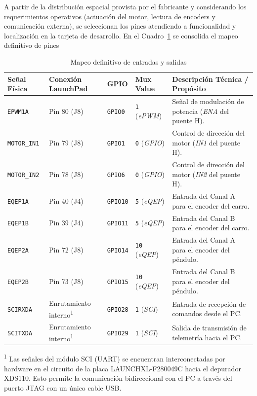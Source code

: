 \documentclass[11pt,fleqn]{book} %
\begin{document}
A partir de la distribución espacial provista por el fabricante y considerando los requerimientos operativos (actuación del motor, lectura de encoders y comunicación externa), se seleccionan los pines atendiendo a funcionalidad y localización en la tarjeta de desarrollo. En el Cuadro~\ref{tab:pinout_sistema} se consolida el mapeo definitivo de pines
\begin{table}[ht]
	\centering
	\caption{Mapeo definitivo de entradas y salidas}
	\label{tab:pinout_sistema}
	\small
	\renewcommand{\arraystretch}{1.1}
	\begin{tabularx}{\textwidth}{l l l l X}
		\hline
		\textbf{Señal Física} & \textbf{Conexión LaunchPad} & \textbf{GPIO} & \textbf{Mux Value} & \textbf{Descripción Técnica / Propósito} \\ \hline
		\texttt{EPWM1A} & Pin 80 (J8) & \texttt{GPIO0} & \texttt{1} (\textit{ePWM}) & Señal de modulación de potencia (\textit{ENA} del puente H). \\
		\texttt{MOTOR\_IN1} & Pin 79 (J8) & \texttt{GPIO1} & \texttt{0} (\textit{GPIO}) & Control de dirección del motor (\textit{IN1} del puente H). \\
		\texttt{MOTOR\_IN2} & Pin 78 (J8) & \texttt{GPIO6} & \texttt{0} (\textit{GPIO}) & Control de dirección del motor (\textit{IN2} del puente H). \\
		\texttt{EQEP1A} & Pin 40 (J4) & \texttt{GPIO10} & \texttt{5} (\textit{eQEP}) & Entrada del Canal A para el encoder del carro. \\
		\texttt{EQEP1B} & Pin 39 (J4) & \texttt{GPIO11} & \texttt{5} (\textit{eQEP}) & Entrada del Canal B para el encoder del carro. \\
		\texttt{EQEP2A} & Pin 72 (J8) & \texttt{GPIO14} & \texttt{10} (\textit{eQEP}) & Entrada del Canal A para el encoder del péndulo. \\
		\texttt{EQEP2B} & Pin 73 (J8) & \texttt{GPIO15} & \texttt{10} (\textit{eQEP}) & Entrada del Canal B para el encoder del péndulo. \\
		\texttt{SCIRXDA} & Enrutamiento interno\textsuperscript{1} & \texttt{GPIO28} & \texttt{1} (\textit{SCI}) & Entrada de recepción de comandos desde el PC. \\
		\texttt{SCITXDA} & Enrutamiento interno\textsuperscript{1} & \texttt{GPIO29} & \texttt{1} (\textit{SCI}) & Salida de transmisión de telemetría hacia el PC. \\ \hline
	\end{tabularx}
	
	\vspace{2mm}
	\begin{minipage}{\textwidth}
		\footnotesize
		\textsuperscript{1} Las señales del módulo SCI (UART) se encuentran interconectadas por hardware en el circuito de la placa LAUNCHXL-F280049C hacia el depurador XDS110. Esto permite la comunicación bidireccional con el PC a través del puerto JTAG con un único cable USB.
	\end{minipage}
\end{table}
\FloatBarrier
\end{document}
